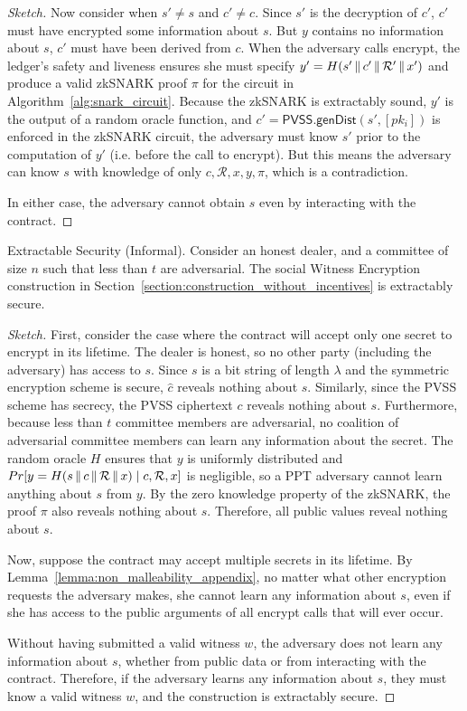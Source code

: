 \begin{proof}[Sketch]
    Now consider when $s' \neq s$ and $c' \neq c$.
    Since $s'$ is the decryption of $c'$, $c'$ must have encrypted some information about $s$.
    But $y$ contains no information about $s$, $c'$ must have been derived from $c$.
    When the adversary calls \textsf{encrypt}, the ledger's safety and liveness ensures she must specify $y' = H(s' \,\|\, c' \,\|\, \mathcal{R}' \,\|\, x')$ and produce a valid zkSNARK proof $\pi$ for the circuit in Algorithm~\ref{alg:snark_circuit}.
    Because the zkSNARK is extractably sound, $y'$ is the output of a random oracle function, and $c' = \textsf{PVSS.genDist}(s', [pk_i])$ is enforced in the zkSNARK circuit,
    the adversary must know $s'$ prior to the computation of $y'$ (i.e. before the call to \textsf{encrypt}).
    But this means the adversary can know $s$ with knowledge of only $c, \mathcal{R}, x, y, \pi$, which is a contradiction.

    In either case, the adversary cannot obtain $s$ even by interacting with the contract.
\end{proof}
\begin{theorem}{Extractable Security (Informal).}\label{thm:security_hm_appendix}
    Consider an honest dealer, and a committee of size $n$ such that less than $t$ are adversarial.
    The social Witness Encryption construction in Section~\ref{section:construction_without_incentives} is extractably secure.
\end{theorem}
\begin{proof}[Sketch]
    First, consider the case where the contract will accept only one secret to encrypt in its lifetime.
    The dealer is honest, so no other party (including the adversary) has access to $s$.
    Since $s$ is a bit string of length $\lambda$ and the symmetric encryption scheme is secure, $\hat{c}$ reveals nothing about $s$.
    Similarly, since the PVSS scheme has secrecy, the PVSS ciphertext $c$ reveals nothing about $s$.
    Furthermore, because less than $t$ committee members are adversarial, no coalition of adversarial committee members can learn any information about the secret.
    The random oracle $H$ ensures that $y$ is uniformly distributed and $Pr[ y = H(s \,\|\, c \,\|\, \mathcal{R} \,\|\, x) \mid c, \mathcal{R}, x ]$ is negligible, so a PPT adversary cannot learn anything about $s$ from $y$.
    By the zero knowledge property of the zkSNARK, the proof $\pi$ also reveals nothing about $s$.
    Therefore, all public values reveal nothing about $s$.

    Now, suppose the contract may accept multiple secrets in its lifetime.
    By Lemma~\ref{lemma:non_malleability_appendix}, no matter what other encryption requests the adversary makes, she cannot learn any information about $s$, even if she has access to the public arguments of all \textsf{encrypt} calls that will ever occur.

    Without having submitted a valid witness $w$, the adversary does not learn any information about $s$, whether from public data or from interacting with the contract.
    Therefore, if the adversary learns any information about $s$, they must know a valid witness $w$, and the construction is extractably secure.
\end{proof}